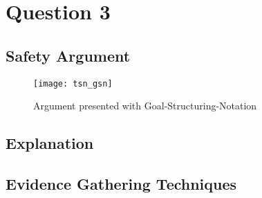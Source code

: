 \section{Question 3}

\subsection{Safety Argument}

\begin{figure}[h]
\centering
\texttt{[image: tsn\_gsn]}
\caption{Argument presented with Goal-Structuring-Notation}
\end{figure}

\subsection{Explanation}

\subsection{Evidence Gathering Techniques}
